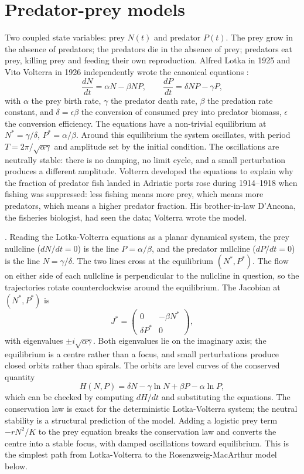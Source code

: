 \section{Predator-prey models}

Two coupled state variables: prey $N(t)$ and predator $P(t)$. The
prey grow in the absence of predators; the predators die in the
absence of prey; predators eat prey, killing prey and feeding their
own reproduction. Alfred Lotka in 1925 and Vito Volterra in 1926
independently wrote the canonical equations
\cite[pp.~88--110]{hist:v6c08-lotka-1925, hist:v6c08-volterra-1926}:
\[
\frac{dN}{dt} = \alpha N - \beta N P, \qquad
\frac{dP}{dt} = \delta N P - \gamma P,
\]
with $\alpha$ the prey birth rate, $\gamma$ the predator death rate,
$\beta$ the predation rate constant, and $\delta = \epsilon \beta$
the conversion of consumed prey into predator biomass, $\epsilon$
the conversion efficiency. The equations have a non-trivial
equilibrium at $N^* = \gamma/\delta$, $P^* = \alpha/\beta$. Around
this equilibrium the system oscillates, with period $T = 2\pi/
\sqrt{\alpha \gamma}$ and amplitude set by the initial condition.
The oscillations are neutrally stable: there is no damping, no
limit cycle, and a small perturbation produces a different
amplitude. Volterra developed the equations to explain why the
fraction of predator fish landed in Adriatic ports rose during
1914--1918 when fishing was suppressed: less fishing means more
prey, which means more predators, which means a higher predator
fraction. His brother-in-law D'Ancona, the fisheries biologist, had
seen the data; Volterra wrote the model.



. Reading the Lotka-Volterra
equations as a planar dynamical system, the prey nullcline ($dN/dt
= 0$) is the line $P = \alpha/\beta$, and the predator nullcline
($dP/dt = 0$) is the line $N = \gamma/\delta$. The two lines cross
at the equilibrium $(N^*, P^*)$. The flow on either side of each
nullcline is perpendicular to the nullcline in question, so the
trajectories rotate counterclockwise around the equilibrium. The
Jacobian at $(N^*, P^*)$ is
\[
J^* = \begin{pmatrix} 0 & -\beta N^* \\ \delta P^* & 0 \end{pmatrix},
\]
with eigenvalues $\pm i\sqrt{\alpha\gamma}$. Both eigenvalues lie on
the imaginary axis; the equilibrium is a centre rather than a focus,
and small perturbations produce closed orbits rather than spirals.
The orbits are level curves of the conserved quantity
\[
H(N, P) = \delta N - \gamma \ln N + \beta P - \alpha \ln P,
\]
which can be checked by computing $dH/dt$ and substituting the
equations. The conservation law is exact for the deterministic
Lotka-Volterra system; the neutral stability is a structural
prediction of the model. Adding a logistic prey term $-rN^2/K$ to
the prey equation breaks the conservation law and converts the
centre into a stable focus, with damped oscillations toward
equilibrium. This is the simplest path from Lotka-Volterra to the
Rosenzweig-MacArthur model below.

